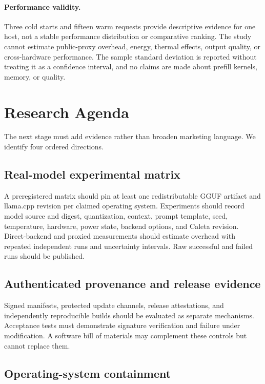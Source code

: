 \documentclass[11pt,a4paper]{article}
\begin{document}
\paragraph{Performance validity.} Three cold starts and fifteen warm requests provide descriptive evidence for one host, not a stable performance distribution or comparative ranking. The study cannot estimate public-proxy overhead, energy, thermal effects, output quality, or cross-hardware performance. The sample standard deviation is reported without treating it as a confidence interval, and no claims are made about prefill kernels, memory, or quality.

\section{Research Agenda}

The next stage must add evidence rather than broaden marketing language. We identify four ordered directions.

\subsection{Real-model experimental matrix}

A preregistered matrix should pin at least one redistributable GGUF artifact and llama.cpp revision per claimed operating system. Experiments should record model source and digest, quantization, context, prompt template, seed, temperature, hardware, power state, backend options, and Caleta revision. Direct-backend and proxied measurements should estimate overhead with repeated independent runs and uncertainty intervals. Raw successful and failed runs should be published.

\subsection{Authenticated provenance and release evidence}

Signed manifests, protected update channels, release attestations, and independently reproducible builds should be evaluated as separate mechanisms. Acceptance tests must demonstrate signature verification and failure under modification. A software bill of materials may complement these controls but cannot replace them.

\subsection{Operating-system containment}
\end{document}

